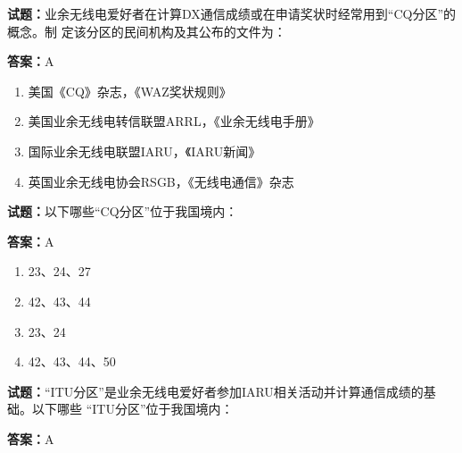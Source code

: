 \documentclass{ctexbook}
\begin{document}




\vspace{1em}

\textbf{试题：}业余无线电爱好者在计算DX通信成绩或在申请奖状时经常用到“CQ分区”的概念。制
定该分区的民间机构及其公布的文件为： 

\textbf{答案：}A 

\begin{enumerate}[leftmargin=3em]
  \item 美国《CQ》杂志，《WAZ奖状规则》 

  \item 美国业余无线电转信联盟ARRL，《业余无线电手册》 

  \item 国际业余无线电联盟IARU，《IARU新闻》 

  \item 英国业余无线电协会RSGB，《无线电通信》杂志 

\end{enumerate}






\vspace{1em}

\textbf{试题：}以下哪些“CQ分区”位于我国境内： 

\textbf{答案：}A 

\begin{enumerate}[leftmargin=3em]
  \item 23、24、27 

  \item 42、43、44 

  \item 23、24 

  \item 42、43、44、50 

\end{enumerate}





\vspace{1em}

\textbf{试题：}“ITU分区”是业余无线电爱好者参加IARU相关活动并计算通信成绩的基础。以下哪些 
“ITU分区”位于我国境内： 

\textbf{答案：}A 
\end{document}
